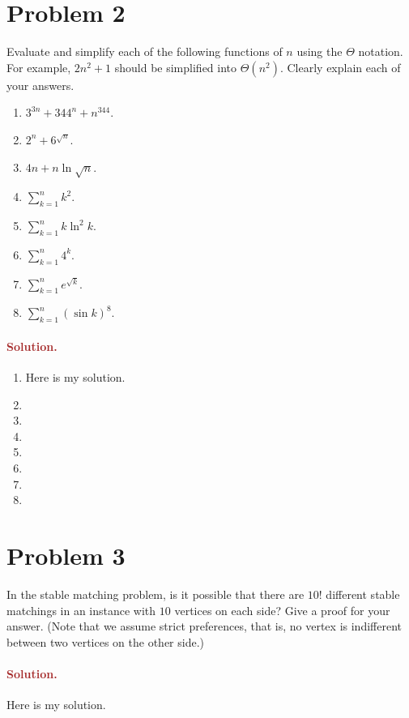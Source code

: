 \section*{Problem 2}
Evaluate and simplify each of the following functions of $n$ using the $\Theta$ notation. For example, $2n^2 + 1$ should be simplified into $\Theta(n^2)$. Clearly explain each of your answers.
\begin{enumerate}
    \item $3^{3n} + 344^n + n^{344}$.
    \item $2^{n} + 6^{\sqrt{n}}$.
    \item $4n + n \ln \sqrt{n}$.
    \item $\sum_{k = 1}^{n} k^2$.
    \item $\sum_{k = 1}^{n} k \ln^2 k$.
    \item $\sum_{k = 1}^{n} 4^k$.
    \item $\sum_{k = 1}^{n} e^{\sqrt{k}}$.
    \item $\sum_{k = 1}^{n} (\sin k)^8$.
\end{enumerate}

\paragraph{\textcolor{brown}{Solution.}}
\begin{enumerate}
    \item Here is my solution.
    \item 
    \item 
    \item 
    \item
    \item 
    \item 
    \item 
\end{enumerate}

\section*{Problem 3}
In the stable matching problem, is it possible that there are $10!$ different stable matchings in an instance with $10$ vertices on each side? Give a proof for your answer. (Note that we assume strict preferences, that is, no vertex is indifferent between two vertices on the other side.)

\paragraph{\textcolor{brown}{Solution.}}
Here is my solution.

